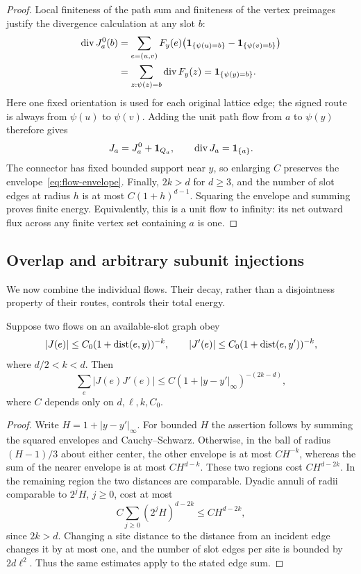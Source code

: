 \begin{proof}
Local finiteness of the path sum and finiteness of the vertex preimages
justify the divergence calculation at any slot $b$:
\begin{align*}
 \operatorname{div}J_a^0(b)
 &=\sum_{e=(u,v)}F_y(e)
       \bigl(\mathbf 1_{\{\psi(u)=b\}}-\mathbf 1_{\{\psi(v)=b\}}\bigr)\\
 &=\sum_{z:\psi(z)=b}\operatorname{div}F_y(z)
 =\mathbf 1_{\{\psi(y)=b\}}.
\end{align*}
Here one fixed orientation is used for each original lattice edge; the
signed route is always from $\psi(u)$ to $\psi(v)$.  Adding the unit path
flow from $a$ to $\psi(y)$ therefore gives
\[
 J_a=J_a^0+\mathbf 1_{Q_a},\qquad
 \operatorname{div}J_a=\mathbf 1_{\{a\}}.
\]
The connector has fixed bounded support near $y$, so enlarging $C$
preserves the envelope~\eqref{eq:flow-envelope}.  Finally,
$2k>d$ for $d\ge3$, and the number of slot edges at radius $h$ is at
most $C(1+h)^{d-1}$.  Squaring the envelope and summing proves finite
energy.  Equivalently, this is a unit flow to infinity: its net outward
flux across any finite vertex set containing $a$ is one.
\end{proof}

\subsection{Overlap and arbitrary subunit injections}

We now combine the individual flows.  Their decay, rather than a
disjointness property of their routes, controls their total energy.

\begin{lemma}\label{lem:flow-overlap}
Suppose two flows on an available-slot graph obey
\[
 |J(e)|\le C_0(1+\operatorname{dist}(e,y))^{-k},\qquad
 |J'(e)|\le C_0(1+\operatorname{dist}(e,y'))^{-k},
\]
where $d/2<k<d$.  Then
\begin{equation}\label{eq:flow-overlap}
 \sum_e |J(e)J'(e)|
 \le C(1+|y-y'|_\infty)^{-(2k-d)},
\end{equation}
where $C$ depends only on $d,\ell,k,C_0$.
\end{lemma}

\begin{proof}
Write $H=1+|y-y'|_\infty$.  For bounded $H$ the assertion follows by
summing the squared envelopes and Cauchy--Schwarz.  Otherwise, in the
ball of radius $(H-1)/3$ about either center, the other envelope is at
most $CH^{-k}$, whereas the sum of the nearer envelope is at most
$CH^{d-k}$.  These two regions cost $CH^{d-2k}$.  In the remaining
region the two distances are comparable.  Dyadic annuli of radii
comparable to $2^jH$, $j\ge0$, cost at most
\[
 C\sum_{j\ge0}(2^jH)^{d-2k}\le CH^{d-2k},
\]
since $2k>d$.  Changing a site distance to the distance from an incident
edge changes it by at most one, and the number of slot edges per site
is bounded by $2d\ell^2$.  Thus the same estimates apply to the stated
edge sum.
\end{proof}

